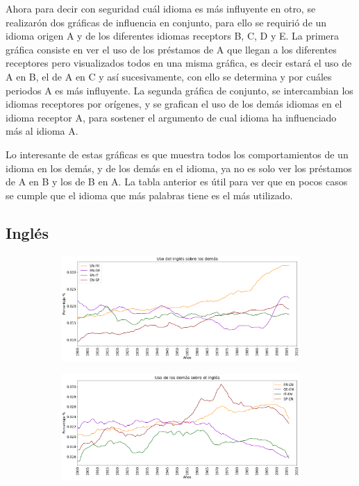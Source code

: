 Ahora para decir con seguridad cuál idioma es más influyente en otro,  se realizarón dos gráficas de influencia en conjunto, para ello se requirió de un idioma origen A y de los diferentes idiomas receptors B, C, D y E.  La primera gráfica consiste en ver  el uso de los préstamos de A que llegan a los diferentes receptores pero visualizados todos en una misma gráfica,  es decir estará el uso de A en B, el de A en C y así sucesivamente,  con ello se determina y por cuáles periodos  A es más influyente.   La segunda gráfica de conjunto, se intercambian los idiomas receptores por orígenes, y se grafican el uso de los demás idiomas en el idioma receptor A, para  sostener el argumento de cual idioma ha influenciado más al idioma A.       

Lo interesante de estas gráficas es que  muestra todos los comportamientos de un idioma en los demás, y de los demás en el idioma,  ya no es solo ver los préstamos de A en B y los de B en A. La tabla anterior es útil para ver que en pocos casos se cumple que el idioma que más palabras tiene es el más utilizado. 

\newpage
\subsection{Inglés}


\begin{figure}[h!]
	
	\begin{subfigure}{}
		\centering
		\includegraphics[scale=.38]{Cap_3/PF1_S2_EN.png}
		\caption{}
		\label{fig:ST_EN_a}
	\end{subfigure}
	
	\begin{subfigure}{}
		\centering
		\includegraphics[scale=.38]{Cap_3/PF2_S2_EN.png}
		\caption{}
		\label{fig:ST_EN_b}
	\end{subfigure}
	
\end{figure}



